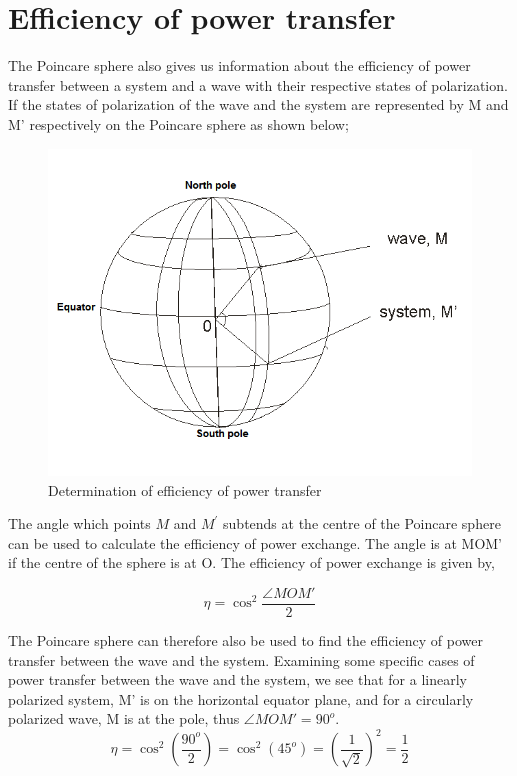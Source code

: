 \section{Efficiency of power transfer}
The Poincare sphere also gives us information about the efficiency of power transfer between a system and a wave with their respective states of polarization. If the states of polarization of the wave and the system are represented by M and M' respectively on the Poincare sphere as shown below;

\begin{figure}
\centering
\includegraphics[width=1\linewidth]{graphics/power}
\caption{Determination of efficiency of power transfer}
\label{fig:power}
\end{figure}

The angle which points $M$ and $M^'$ subtends at the centre of the Poincare sphere can be used to calculate the efficiency of power exchange.
The angle is at MOM' if the centre of the sphere is at O. The efficiency of power exchange is given by,

\[\eta = \cos^2 {\frac{ \angle  MOM' }{2}}  \]

The Poincare sphere can therefore also be used to find the efficiency of power transfer between the wave and the system. Examining some specific cases of power transfer between the wave and the system, we see that for a linearly polarized system, M' is on the horizontal equator plane, and for a circularly polarized wave, M is at the pole, thus $\angle MOM' = 90^o$.
\[ \eta= \cos ^2(\frac{90^o}{2}) =\cos ^2(45^o) =(\frac{1}{\sqrt{2}})^2  = \frac{1}{2}\]

